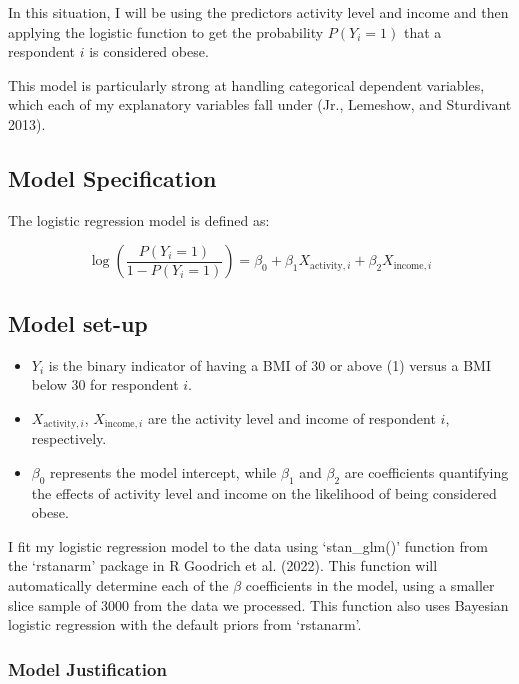 \documentclass[
  letterpaper,
  DIV=11,
  numbers=noendperiod]{scrartcl}
\providecommand{\tightlist}{%
  \setlength{\itemsep}{0pt}\setlength{\parskip}{0pt}}\usepackage{longtable,booktabs,array}
\begin{document}
In this situation, I will be using the predictors activity level and
income and then applying the logistic function to get the probability
\(P(Y_i=1)\) that a respondent \(i\) is considered obese.

This model is particularly strong at handling categorical dependent
variables, which each of my explanatory variables fall under (Jr.,
Lemeshow, and Sturdivant 2013).

\hypertarget{model-specification}{%
\subsection{Model Specification}\label{model-specification}}

The logistic regression model is defined as:

\[
\log\left(\frac{P(Y_i=1)}{1 - P(Y_i=1)}\right) = \beta_0 + \beta_1X_{\text{activity},i} + \beta_2X_{\text{income},i}
\]

\hypertarget{model-set-up}{%
\subsection{Model set-up}\label{model-set-up}}

\begin{itemize}
\tightlist
\item
  \(Y_i\) is the binary indicator of having a BMI of 30 or above (1)
  versus a BMI below 30 for respondent \(i\).
\item
  \(X_{\text{activity},i}\), \(X_{\text{income},i}\) are the activity
  level and income of respondent \(i\), respectively.
\item
  \(\beta_0\) represents the model intercept, while \(\beta_1\) and
  \(\beta_2\) are coefficients quantifying the effects of activity level
  and income on the likelihood of being considered obese.
\end{itemize}

I fit my logistic regression model to the data using `stan\_glm()'
function from the `rstanarm' package in R Goodrich et al. (2022). This
function will automatically determine each of the \(\beta\) coefficients
in the model, using a smaller slice sample of 3000 from the data we
processed. This function also uses Bayesian logistic regression with the
default priors from `rstanarm'.

\hypertarget{model-justification}{%
\subsubsection{Model Justification}\label{model-justification}}
\end{document}
